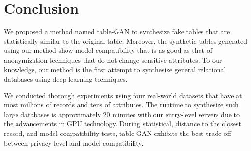\documentclass[sigconf,edbt]{acmart-edbt2018}
\begin{document}


\section{Conclusion}
We proposed a method named table-GAN to synthesize fake tables that are statistically similar to the original table. Moreover, the synthetic tables generated using our method show model compatibility that is as good as that of anonymization techniques that do not change sensitive attributes. To our knowledge, our method is the first attempt to synthesize general relational databases using deep learning techniques.

We conducted thorough experiments using four real-world datasets that have at most millions of records and tens of attributes. The runtime to synthesize such large databases is approximately 20 minutes with our entry-level servers due to the advancements in GPU technology. During statistical, distance to the closest record, and model compatibility tests, table-GAN exhibits the best trade-off between privacy level and model compatibility.




% 
\end{document}
